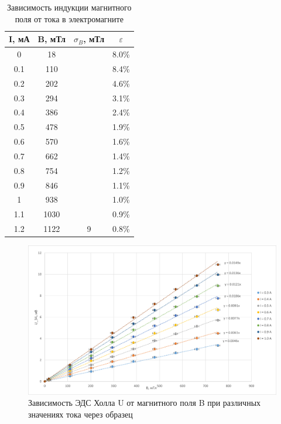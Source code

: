 \begin{table}[H]
\centering
\caption{Зависимость индукции магнитного поля от тока в электромагните}
\label{t2}
\begin{tabular}{|c|c|c|c|}
\hline
\rowcolor[HTML]{A9D08E} 
I, мА & B, мТл & $\sigma_B$, мТл      & $\varepsilon$ \\ \hline
0    & 18     &                      & 8.0\%         \\ \cline{1-2} \cline{4-4} 
0.1  & 110    &                      & 8.4\%         \\ \cline{1-2} \cline{4-4} 
0.2  & 202    &                      & 4.6\%         \\ \cline{1-2} \cline{4-4} 
0.3  & 294    &                      & 3.1\%         \\ \cline{1-2} \cline{4-4} 
0.4  & 386    &                      & 2.4\%         \\ \cline{1-2} \cline{4-4} 
0.5  & 478    &                      & 1.9\%         \\ \cline{1-2} \cline{4-4} 
0.6  & 570    &                      & 1.6\%         \\ \cline{1-2} \cline{4-4} 
0.7  & 662    &                      & 1.4\%         \\ \cline{1-2} \cline{4-4} 
0.8  & 754    &                      & 1.2\%         \\ \cline{1-2} \cline{4-4} 
0.9  & 846    &                      & 1.1\%         \\ \cline{1-2} \cline{4-4} 
1    & 938    &                      & 1.0\%         \\ \cline{1-2} \cline{4-4} 
1.1  & 1030   &                      & 0.9\%         \\ \cline{1-2} \cline{4-4} 
1.2  & 1122   & \multirow{-13}{*}{9} & 0.8\%         \\ \hline
\end{tabular}
\end{table}

\begin{figure}[H]
    \centering
    \includegraphics[width=1\textwidth]{pictures/все.png}
    \caption{Зависимость ЭДС Холла U от магнитного поля B при различных значениях тока через образец}
\end{figure} 

